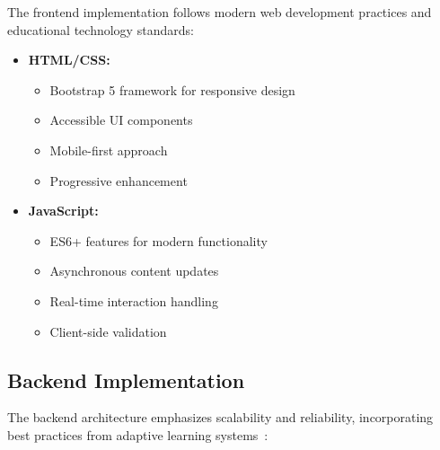 The frontend implementation follows modern web development practices and educational technology standards:

\begin{itemize}
  \item \textbf{HTML/CSS:} 
    \begin{itemize}
      \item Bootstrap 5 framework for responsive design
      \item Accessible UI components
      \item Mobile-first approach
      \item Progressive enhancement
    \end{itemize}
  
  \item \textbf{JavaScript:} 
    \begin{itemize}
      \item ES6+ features for modern functionality
      \item Asynchronous content updates
      \item Real-time interaction handling
      \item Client-side validation
    \end{itemize}
\end{itemize}

\subsection{Backend Implementation}
\label{subsec:backend}

The backend architecture emphasizes scalability and reliability, incorporating best practices from adaptive learning systems~\cite{rodriguez2024adaptive}:

